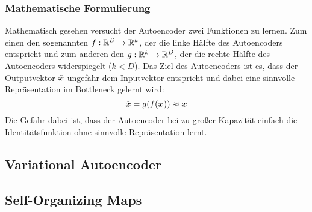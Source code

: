 \subsubsection{Mathematische Formulierung}
\label{ch:MethodenDerDimRed:modern:AE:MathematischeFormulierung}
Mathematisch gesehen versucht der Autoencoder zwei Funktionen zu lernen. Zum einen den sogenannten  $f: \mathbb{R}^D \rightarrow \mathbb{R}^k$, der die linke Hälfte des Autoencoders entspricht und zum anderen den  $g: \mathbb{R}^k \rightarrow \mathbb{R}^D$, der die rechte Hälfte des Autoencoders widerspiegelt ($k < D$). Das Ziel des Autoencoders ist es, dass der Outputvektor $\tilde{\bm{x}}$ ungefähr dem Inputvektor entspricht und dabei eine sinnvolle Repräsentation im Bottleneck gelernt wird:
\begin{equation}
	\tilde{\bm{x}} = g(f(\bm{x})) \approx \bm{x}
\end{equation}
Die Gefahr dabei ist, dass der Autoencoder bei zu großer Kapazität einfach die Identitätsfunktion ohne sinnvolle Repräsentation lernt.


\subsection{Variational Autoencoder}
\label{ch:MethodenDerDimRed:modern:VAE}

\subsection{Self-Organizing Maps}
\label{ch:MethodenDerDimRed:modern:SOM}
